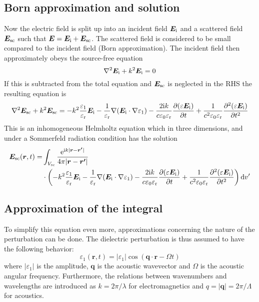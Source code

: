\documentclass[11pt,twoside]{eitExjobb}
\begin{document}
	\subsection{Born approximation and solution \label{sec:app-derivations-scatter-born}}
	Now the electric field is split up into an incident field $\bm{E}_{\mathrm{i}}$ and a scattered field $\bm{E}_{\mathrm{sc}}$ such that $\bm{E} = \bm{E}_{\mathrm{i}} + \bm{E}_{\mathrm{sc}}$. The scattered field is considered to be small compared to the incident field (Born approximation). The incident field then approximately obeys the source-free equation
	\begin{equation*}
		\nabla^2 \bm{E}_{\mathrm{i}} + k^2 \bm{E}_{\mathrm{i}} = 0
	\end{equation*}
	If this is subtracted from the total equation and $\bm{E}_{\mathrm{sc}}$ is neglected in the RHS the resulting equation is
	\begin{equation*}
		\nabla^2\bm{E}_{\mathrm{sc}} + k^2 \bm{E}_{\mathrm{sc}} =	-k^2 \frac{\varepsilon_1}{\varepsilon_{\mathrm{r}}} \bm{E}_{\mathrm{i}} -\frac{1}{\varepsilon_{\mathrm{r}}}\nabla(\bm{E}_{\mathrm{i}} \cdot \nabla \varepsilon_1) - \frac{2\mathrm{i} k}{c\varepsilon_0\varepsilon_{\mathrm{r}}} \frac{\partial (\varepsilon \bm{E}_{\mathrm{i}})}{\partial t} + \frac{1}{c^2 \varepsilon_0 \varepsilon_{\mathrm{r}}} \frac{\partial^2 (\varepsilon \bm{E}_{\mathrm{i}})}{\partial t^2}
	\end{equation*}
	This is an inhomogeneous Helmholtz equation which in three dimensions, and under a Sommerfeld radiation condition has the solution \addref
	\begin{equation*}
	\begin{split}
		\bm{E}_{\mathrm{sc}}(\bm{r},t) =& \int_{V_{\mathrm{sc}}} \frac{\mathrm{e}^{\mathrm{i} k |\bm{r}-\bm{r'}| }}{4\pi |\bm{r}-\bm{r'}|} \\
		&\cdot \left( -k^2 \frac{\varepsilon_1}{\varepsilon_{\mathrm{r}}} \bm{E}_{\mathrm{i}} -\frac{1}{\varepsilon_{\mathrm{r}}}\nabla(\bm{E}_{\mathrm{i}} \cdot \nabla \varepsilon_1)- \frac{2\mathrm{i} k}{c\varepsilon_0\varepsilon_{\mathrm{r}}} \frac{\partial (\varepsilon \bm{E}_{\mathrm{i}})}{\partial t} + \frac{1}{c^2 \varepsilon_0 \varepsilon_{\mathrm{r}}} \frac{\partial^2 (\varepsilon \bm{E}_{\mathrm{i}})}{\partial t^2} \right) \mathrm{d}v'
	\end{split}
	\end{equation*}
	
	\subsection{Approximation of the integral \label{sec:app-derivations-scatter-approx}}
	To simplify this equation even more, approximations concerning the nature of the perturbation can be done. The dielectric perturbation is thus assumed to have the following behavior:
	\begin{equation*}
		\varepsilon_1 (\bm{r},t) = |\varepsilon_1| \cos(\bm{q} \cdot \bm{r} - \Omega t)
	\end{equation*}
	where $|\varepsilon_1|$ is the amplitude, $\bm{q}$ is the acoustic wavevector and $\Omega$ is the acoustic angular frequency. Furthermore, the relations between wavenumbers and wavelengths are introduced as $k = 2\pi/\lambda$ for electromagnetics and $q = |\bm{q}| = 2\pi/\Lambda$ for acoustics.
	
\end{document}
